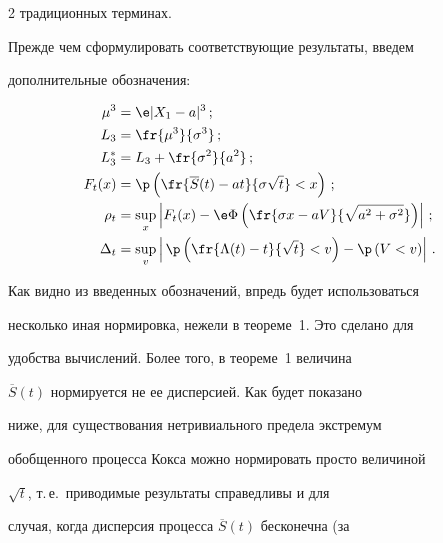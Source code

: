 \begin{multicols}{2}
традиционных терминах.





Прежде чем сформулировать соответствующие результаты, введем


дополнительные обозначения:


\begin{align*}


\mu^3 &= \e|X_1-a|^3\,;\\


L_3 &= \fr{\mu^3}{\sigma^3}\,;\\


L_3\* & = L_3+\fr{\sigma^2}{a^2}\,;\\


F_t(x) &= \p\left(\fr{\overline{S}(t)-at}{\sigma\sqrt{t}}<


x\right)\,;


\\








\rho_t &=\sup_x \left|F_t(x) - \e \Phi\left(\fr{\sigma x -


aV}{{\sqrt{a^2 + \sigma^2}}}\right) \right|\,;\\


\Delta_t &=


\sup_{v}\left|\,\p\left(\fr{\Lambda(t)-t}{\sqrt{t}}<v\right)-\p


\left(V <v\right)\right|\,.


\end{align*}


Как видно из введенных обозначений, впредь будет использоваться


несколько иная нормировка, нежели в теореме~1. Это сделано для


удобства вычислений. Более того, в теореме~1 величина


$\overline{S}(t)$ нормируется не ее дисперсией. Как будет показано


ниже, для существования нетривиального предела экстремум


обобщенного процесса Кокса можно нормировать просто величиной


$\sqrt{t}$, т.\,е.\ приводимые результаты справедливы и для


случая, когда дисперсия процесса $\overline{S}(t)$ бесконечна (за



\end{multicols}
